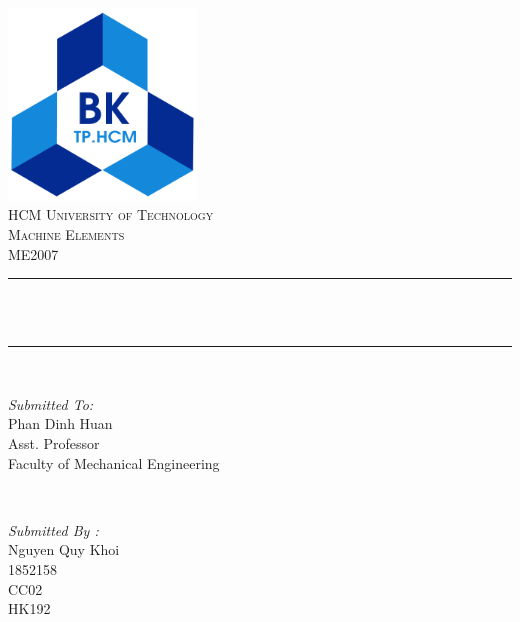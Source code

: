 \documentclass{presets}
\begin{document}
	\begin{titlepage}
		\centering
		\includegraphics[width=5cm]{logo.png}\\[1.0 cm]	%
		\textsc{\LARGE HCM University of Technology}\\[1cm] %
		\textsc{\Large Machine Elements}\\[0.5cm] %
		\textsc{\Large ME2007}\\[0.5 cm]				%
		\rule{\linewidth}{0.2 mm} \\[0.4 cm]
		{ \huge \bfseries \thetitle}\\
		\rule{\linewidth}{0.2 mm} \\[1.5 cm]
		
		\begin{minipage}{0.4\textwidth}
			\begin{flushleft} \large
				\emph{Submitted To:}\\
				Phan Dinh Huan\\
				Asst. Professor\\
				Faculty of Mechanical Engineering\\
			\end{flushleft}
		\end{minipage}~
		\begin{minipage}{0.4\textwidth}
			
			\begin{flushright} \large
				\emph{Submitted By :} \\
				Nguyen Quy Khoi\\
				1852158\\
				CC02\\
				HK192\\
			\end{flushright}
			
		\end{minipage}\\[2 cm]
		
	\end{titlepage}
	\tableofcontents
	\listoftables
	\listoffigures
	\newpage
\end{document}
